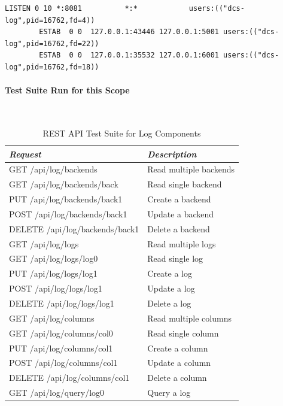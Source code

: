       \begin{lstlisting}[caption={Socket Status During Log Tests},
                         label={lst:test-rest-log-ss}]
        LISTEN 0 10 *:8081          *:*            users:(("dcs-log",pid=16762,fd=4))
        ESTAB  0 0  127.0.0.1:43446 127.0.0.1:5001 users:(("dcs-log",pid=16762,fd=22))
        ESTAB  0 0  127.0.0.1:35532 127.0.0.1:6001 users:(("dcs-log",pid=16762,fd=18))
      \end{lstlisting}

      \newpage
      \paragraph{Test Suite Run for this Scope}\mbox{}\\

      \begin{table}[H]
        \centering
        \begin{tabular}{p{3in} p{3in}}
          \toprule
          \emph{Request} & \emph{Description} \\ [0.5ex]
          \midrule
             GET /api/log/backends        & Read multiple backends \\
             GET /api/log/backends/back   &   Read single backend \\
             PUT /api/log/backends/back1  &      Create a backend \\
            POST /api/log/backends/back1  &      Update a backend \\
          DELETE /api/log/backends/back1  &      Delete a backend \\
             GET /api/log/logs            & Read multiple logs \\
             GET /api/log/logs/log0       &   Read single log \\
             PUT /api/log/logs/log1       &      Create a log \\
            POST /api/log/logs/log1       &      Update a log \\
          DELETE /api/log/logs/log1       &      Delete a log \\
             GET /api/log/columns         & Read multiple columns \\
             GET /api/log/columns/col0    &   Read single column \\
             PUT /api/log/columns/col1    &      Create a column \\
            POST /api/log/columns/col1    &      Update a column \\
          DELETE /api/log/columns/col1    &      Delete a column \\
             GET /api/log/query/log0      & Query a log \\
          \bottomrule
        \end{tabular}
        \caption{REST API Test Suite for Log Components}\label{tab:test-rest-log-suite}
      \end{table}

